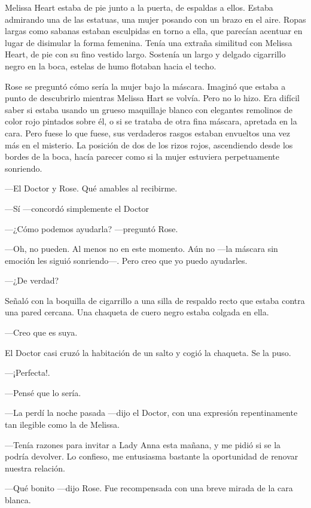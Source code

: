 {Melissa Heart estaba de pie junto a la puerta, de espaldas a ellos.
	Estaba admirando una de las estatuas, una mujer posando con un brazo en
	el aire. Ropas largas como sabanas estaban esculpidas en torno a ella,
	que parecían acentuar en lugar de disimular la forma femenina. Tenía una
	extraña similitud con Melissa Heart, de pie con su fino vestido largo.
	Sostenía un largo y delgado cigarrillo negro en la boca, estelas de humo
flotaban hacia el techo.}

{Rose se preguntó cómo sería la mujer bajo la máscara. Imaginó que
	estaba a punto de descubrirlo mientras Melissa Hart se volvía. Pero no
	lo hizo. Era difícil saber si estaba usando un grueso maquillaje blanco
	con elegantes remolinos de color rojo pintados sobre él, o si se trataba
	de otra fina máscara, apretada en la cara. Pero fuese lo que fuese, sus
	verdaderos rasgos estaban envueltos una vez más en el misterio. La
	posición de dos de los rizos rojos, ascendiendo desde los bordes de la
boca, hacía parecer como si la mujer estuviera perpetuamente sonriendo.}

{---El Doctor y Rose. Qué amables al recibirme.}

{---Sí ---concordó simplemente el Doctor}

{---¿Cómo podemos ayudarla? ---preguntó Rose.}

{---Oh, no pueden. Al menos no en este momento. Aún no ---la máscara sin
emoción les siguió sonriendo---. Pero creo que yo puedo ayudarles.}

{---¿De verdad?}

{Señaló con la boquilla de cigarrillo a una silla de respaldo recto que
	estaba contra una pared cercana. Una chaqueta de cuero negro estaba
colgada en ella.}

{---Creo que es suya.}

{El Doctor casi cruzó la habitación de un salto y cogió la chaqueta. Se
la puso.}

{---¡Perfecta!.}

{---Pensé que lo sería.}

{---La perdí la noche pasada ---dijo el Doctor, con una expresión
repentinamente tan ilegible como la de Melissa.}

{---Tenía razones para invitar a Lady Anna esta mañana, y me pidió si se
	la podría devolver. Lo confieso, me entusiasma bastante la oportunidad
de renovar nuestra relación.}

{---Qué bonito ---dijo Rose. Fue recompensada con una breve mirada de la
cara blanca.}

